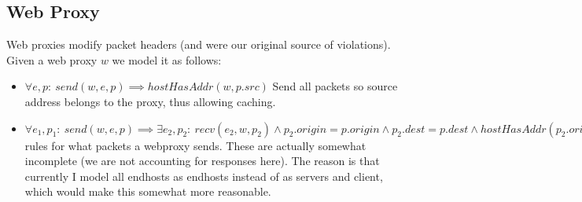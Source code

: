\subsection{Web Proxy}
Web proxies modify packet headers (and were our original source of violations). Given a web proxy $w$ we model it as
follows:
\begin{itemize}
\item $\forall e, p:\ send(w, e, p) \implies hostHasAddr(w, p.src)$ Send all packets so source address belongs to the
proxy, thus allowing caching.
\item $\forall e_1, p_1:\ send(w, e, p) \implies \exists e_2, p_2:\ recv(e_2, w, p_2) \land p_2.origin = p.origin \land
p_2.dest = p.dest \land hostHasAddr(p_2.origin, p_2.src) \land etime(w, p_1, S) \geq etime(w, p_1, R)$ rules for what
packets a webproxy sends. These are actually somewhat incomplete (we are not accounting for responses here). The
reason is that currently I model all endhosts as endhosts instead of as servers and client, which would make this
somewhat more reasonable.
\end{itemize}
